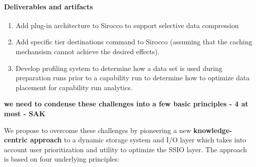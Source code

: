 
\paragraph{Deliverables and artifacts}

\begin{enumerate}
\item Add plug-in architecture to Sirocco to support selective data compression
\item Add specific tier destinations command to Sirocco (assuming that the caching mechansism cannot achieve the desired effects).
\item Develop profiling system to determine how a data set is used during preparation runs prior to a capability run to determine how to optimize data placement for capability run analytics.

\end{enumerate}

{\bf \color{red}we need to condense these challenges into a few basic principles - 4 at most - SAK}

We propose to overcome these challenges by pioneering a new {\bf knowledge-centric approach} to a dynamic storage system
and I/O layer which takes into account user prioritization and utility to optimize the SSIO layer. The approach is based on 
four underlying principles:

